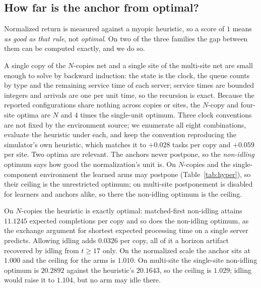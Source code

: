 \documentclass[review,authoryear,3p,times]{elsarticle}
\begin{document}
\subsection{How far is the anchor from optimal?}
\label{sec:optimum}

Normalized return is measured against a myopic heuristic, so a score of $1$
means \emph{as good as that rule}, not \emph{optimal}. On two of the three
families the gap between them can be computed exactly, and we do so.

A single copy of the $N$-copies net and a single site of the multi-site net
are small enough to solve by backward induction: the state is the clock, the
queue counts by type and the remaining service time of each server; service
times are bounded integers and arrivals are one per unit time, so the recursion
is exact. Because the reported configurations share nothing across copies or
sites, the $N$-copy and four-site optima are $N$ and $4$ times the single-unit
optimum. Three clock conventions are not fixed by the environment source; we
enumerate all eight combinations, evaluate the heuristic under each, and keep
the convention reproducing the simulator's own heuristic, which matches it to
$+0.028$ tasks per copy and $+0.059$ per site. Two optima are relevant. The
anchors never postpone, so the \emph{non-idling} optimum says how good the
normalization's unit is. On $N$-copies and the single-component environment
the learned arms may postpone (Table~\ref{tab:hyper}), so their ceiling is the
unrestricted optimum; on multi-site postponement is disabled for learners and
anchors alike, so there the non-idling optimum is the ceiling.

On $N$-copies the heuristic is exactly optimal: matched-first non-idling
attains $11.1245$ expected completions per copy and so does the non-idling
optimum, as the exchange argument for shortest expected processing time on a
single server predicts. Allowing idling adds $0.0326$ per copy, all of it a
horizon artifact recovered by idling from $t\ge17$ only. On the normalized
scale the anchor sits at $1.000$ and the ceiling for the arms is $1.010$. On
multi-site the single-site non-idling optimum is $20.2892$ against the
heuristic's $20.1643$, so the ceiling is $1.029$; idling would raise it to
$1.104$, but no arm may idle there.
\end{document}
